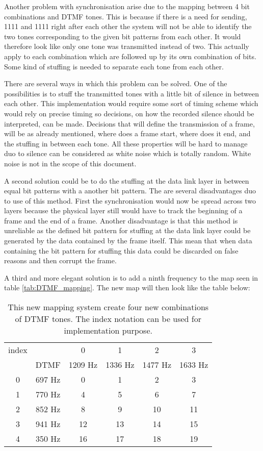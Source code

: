 	Another problem with synchronisation arise due to the mapping between 4 bit combinations and DTMF tones. This is because if there is a
	need for sending, 1111 and 1111 right after each other the system will not be able to identify the two tones corresponding to the
	given bit patterns from each other. It would therefore look like only one tone was transmitted instead of two. This actually apply
	to each combination which are followed up by its own combination of bits. Some kind of stuffing is needed to separate each tone
	from each other.
	
	There are several ways in which this problem can be solved. One of the possibilities is to stuff the transmitted tones with a little
	bit of silence in between each other. This implementation would require some sort of timing scheme which would rely on precise timing
	so decisions, on how the recorded silence should be interpreted, can be made. Decisions that will define the transmission of a frame, will be as 
	already mentioned, where does a frame start, where does it end, and the stuffing in between each tone. All these properties will be
	hard to manage duo to silence can be considered as white noise which is totally random. White noise is not in the scope of this 
	document.
	
	A second solution could be to do the stuffing at the data link layer in between equal bit patterns with a another bit pattern. 
	The are several disadvantages duo to use of this method. First the synchronisation would now be spread across two layers because
	the physical layer still would have to track the beginning of a frame and the end of a frame. Another disadvantage is that this 
	method is unreliable as the defined bit pattern for stuffing at the data link layer could be generated by the data contained by the 
	frame itself. This mean that when data containing the bit pattern for stuffing this data could be discarded on false reasons and
	then corrupt the frame.
	
	A third and more elegant solution is to add a ninth frequency to the map seen in table \ref{tab:DTMF_mapping}. The new map will
	then look like the table below:
	
	\begin{table}[htb]
		\begin{center}
			\begin{tabular}{c c|c c c c}
	 		index & & 0 & 1 & 2 & 3 \\
			& DTMF & 1209 Hz & 1336 Hz & 1477 Hz & 1633 Hz \\
			\hline
			0 & 697 Hz & 0 & 1 & 2 & 3 \\
			1 & 770 Hz & 4 & 5 & 6 & 7 \\
			2 & 852 Hz & 8 & 9 & 10 & 11 \\
			3 & 941 Hz & 12 & 13 & 14 & 15 \\
			4 & 350 Hz & 16 & 17 & 18 & 19 \\
			\end{tabular}
		\end{center}
		\caption{This new mapping system create four new combinations of DTMF tones. The index notation can be used for
		implementation purpose.}
		\label{tab:newDTMF_mapping}
	\end{table}
	
